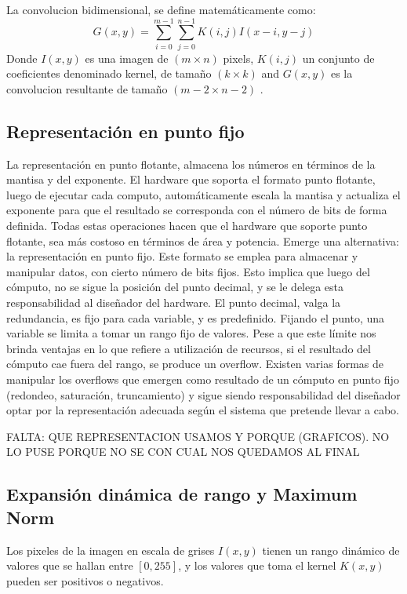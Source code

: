\documentclass[]{IEEEphot}
\begin{document}
La convolucion bidimensional, se define matemáticamente como:
\begin{equation}\label{conv-org}
  G(x,y) = \sum_{i=0}^{m-1} \sum_{j=0}^{n-1}K(i,j)I(x-i,y-j)
\end{equation}
Donde $I(x,y)$ es una imagen de $(m \times n)$ pixels, $K(i,j)$ un conjunto de coeficientes denominado kernel, de tamaño
$(k \times k)$ and $G(x,y)$ es la convolucion resultante de tamaño  $(m-2 \times n-2)$ .

\subsection{Representación en punto fijo}\label{fixedpoint}

La representación en punto flotante, almacena los números en términos de la mantisa y del exponente. El hardware que soporta el formato punto flotante, luego de ejecutar cada computo, 
automáticamente escala la mantisa y actualiza el exponente para que el resultado se corresponda con el número de bits de forma definida. Todas estas operaciones hacen que el hardware que soporte punto flotante,
sea más costoso en términos de área y potencia. Emerge una alternativa: la representación en punto fijo.
Este formato se emplea para almacenar y manipular datos, con cierto número de bits fijos. Esto implica que luego del cómputo, no se sigue la posición del punto decimal, y
se le delega esta responsabilidad al diseñador del hardware. El punto decimal, valga la redundancia, es fijo para cada variable, y es predefinido.
Fijando el punto, una variable se limita a tomar un rango fijo de valores.
Pese a que este límite nos brinda ventajas en lo que refiere a utilización de recursos, si el resultado del cómputo cae fuera del rango, se produce un overflow. Existen varias
formas de manipular los overflows que emergen como resultado de un cómputo en punto fijo (redondeo, saturación, truncamiento) y sigue siendo responsabilidad del diseñador optar por
la representación adecuada según el sistema que pretende llevar a cabo.

FALTA:    QUE REPRESENTACION USAMOS Y  PORQUE (GRAFICOS). NO LO PUSE PORQUE NO SE CON CUAL NOS QUEDAMOS AL FINAL

\subsection{Expansión dinámica de rango y Maximum Norm}\label{dynamicrange}
Los pixeles de la imagen en escala de grises $I(x,y)$ tienen un rango dinámico de valores que se hallan entre $[0,255]$,
y los valores que toma el kernel $K(x,y)$ pueden ser positivos o negativos.
\end{document}
